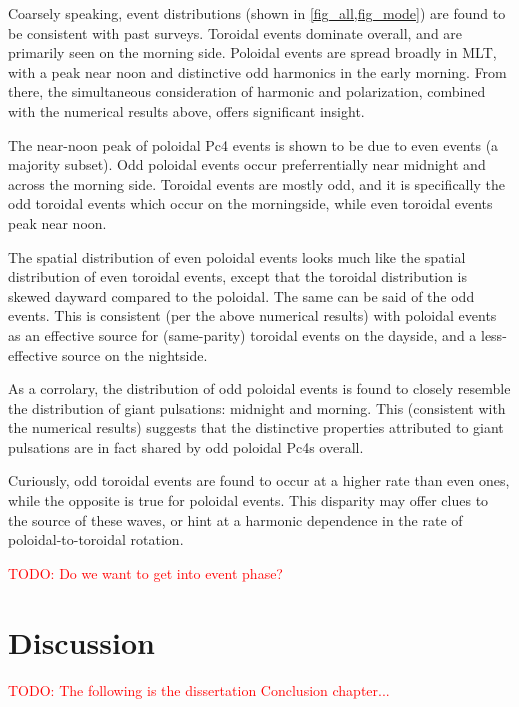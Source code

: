 \documentclass{article}
\newcommand{\todo}[1]{ \textcolor{red}{TODO: #1} }
\begin{document}
Coarsely speaking, event distributions (shown in \cref{fig_all,fig_mode}) are found to be consistent with past surveys. Toroidal events dominate overall, and are primarily seen on the morning side. Poloidal events are spread broadly in MLT, with a peak near noon and distinctive odd harmonics in the early morning. From there, the simultaneous consideration of harmonic and polarization, combined with the numerical results above, offers significant insight.

The near-noon peak of poloidal Pc4 events is shown to be due to even events (a majority subset). Odd poloidal events occur preferrentially near midnight and across the morning side. Toroidal events are mostly odd, and it is specifically the odd toroidal events which occur on the morningside, while even toroidal events peak near noon.

The spatial distribution of even poloidal events looks much like the spatial distribution of even toroidal events, except that the toroidal distribution is skewed dayward compared to the poloidal. The same can be said of the odd events. This is consistent (per the above numerical results) with poloidal events as an effective source for (same-parity) toroidal events on the dayside, and a less-effective source on the nightside.

As a corrolary, the distribution of odd poloidal events is found to closely resemble the distribution of giant pulsations: midnight and morning. This (consistent with the numerical results) suggests that the distinctive properties attributed to giant pulsations are in fact shared by odd poloidal Pc4s overall.

Curiously, odd toroidal events are found to occur at a higher rate than even ones, while the opposite is true for poloidal events. This disparity may offer clues to the source of these waves, or hint at a harmonic dependence in the rate of poloidal-to-toroidal rotation.

\todo{Do we want to get into event phase?}


\section{Discussion}

\todo{The following is the dissertation Conclusion chapter...}
\end{document}
